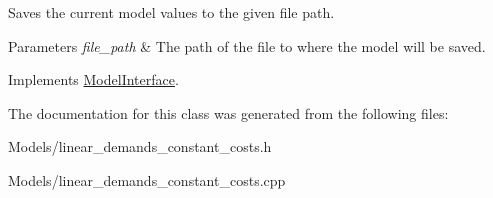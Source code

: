Saves the current model values to the given file path.


\begin{DoxyParams}{Parameters}
{\em file\+\_\+path} & The path of the file to where the model will be saved. \\
\hline
\end{DoxyParams}


Implements \hyperlink{classModelInterface_ab5709db8ecb96fd9efd02f4777d5502a}{Model\+Interface}.



The documentation for this class was generated from the following files\+:\begin{DoxyCompactItemize}
\item 
Models/linear\+\_\+demands\+\_\+constant\+\_\+costs.\+h\item 
Models/linear\+\_\+demands\+\_\+constant\+\_\+costs.\+cpp\end{DoxyCompactItemize}
